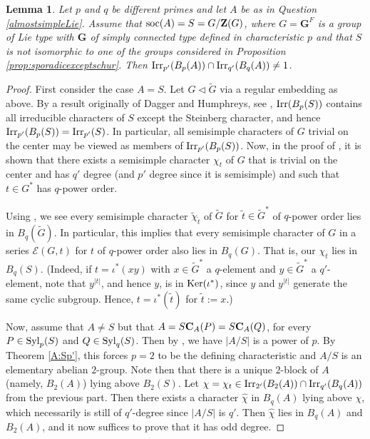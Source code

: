 \documentclass[12pt,leqno,a4paper]{amsart}
\def\zent#1{{\bf Z}(#1)}
\def\irr#1{{\rm Irr}(#1)}
\def\cent#1#2{{\bf C}_{#1}(#2)}
\def\ker#1{{\rm Ker}(#1)}
\def\irrp#1#2{{\rm Irr}_{#1'}(#2)}
\newtheorem{lem}[thm]{Lemma}
\theoremstyle{remark}
\newcommand\wt[1]{\widetilde{#1}}
\begin{document}
\begin{lem}\label{definingchar}
Let $p$ and $q$ be different primes and let $A$ be as in Question \ref{almostsimpleLie}. Assume that $\mathrm{soc}(A)=S=G/\zent{G}$, where $G=\mathbf{G}^F$ is a group of Lie type with $\mathbf{G}$ of simply connected type defined in characteristic $p$ and that $S$ is not isomorphic to one of the groups considered in Proposition \ref{prop:sporadicexceptschur}.  Then $\irrp{p}{B_p(A)} \cap  \irrp{q}{B_q(A)}\neq1$.
\end{lem}
\begin{proof}
First consider the case $A=S$. Let $G\lhd \wt{G}$ via a regular embedding as above.
By a result originally of Dagger and Humphreys, see \cite[Proposition 1.18 and Theorem 3.3]{Cab18}, $\irr{B_p(S)}$ contains all irreducible characters of $S$ except the Steinberg character, and hence $\irrp{p}{B_p(S)}=\irrp{p}{S}$.  In particular, all semisimple characters of $G$ trivial on the center may be viewed as members of $\irrp{p}{B_p(S)}$.  
  Now, in the proof of \cite[Theorem 3.5]{GSV19}, it is shown that there exists a semisimple character $\chi_t$ of $G$ that is trivial on the center and has $q'$ degree (and $p'$ degree since it is semisimple) 
  and such that $t\in G^\ast$ has $q$-power order.
  
   
   Using \cite[Corollary 3.3]{Hiss90}, 
   we see every semisimple character $\wt{\chi}_{\wt{t}}$ of $\wt{G}$ for $\wt{t}\in \wt{G}^\ast$ of $q$-power order lies in $B_q(\wt{G})$.  
   In particular, this implies that every semisimple character of $G$ in a series $\mathcal{E}(G, t)$ for $t$ of $q$-power order also lies in $B_q(G)$. That is, our $\chi_t$ lies in $B_q(S)$. (Indeed, if $t=\iota^\ast(xy)$ with $x\in \wt{G}^\ast$ a $q$-element and $y\in \wt{G}^\ast$ a $q'$-element, note that $y^{|t|}$, and hence $y$, is in $\ker{\iota^\ast}$, since $y$ and $y^{|t|}$ generate the same cyclic subgroup.  Hence, $t=\iota^\ast(\wt{t})$ for $\wt{t}:=x$.) 
  

  
  Now, assume that $A\neq S$ but that $A=S\cent A P=S\cent A Q$, for every $P\in{\rm Syl}_p(S)$ and $Q\in{\rm Syl}_q(S)$.  
  Then by \cite[Lemma 2.2]{BZ}, we have $|A/S|$ is a power of $p$.  By Theorem \ref{A:Sp'}, this forces $p=2$ to be the defining characteristic and   $A/S$ is an elementary abelian $2$-group.  Note then that  there is a unique $2$-block of $A$ (namely, $B_2(A)$) lying above $B_2(S)$. 
   Let $\chi=\chi_t\in \irrp{2}{B_2(A)} \cap  \irrp{q}{B_q(A)}$ from the previous part.  Then there exists a character $\hat \chi$ in $B_q(A)$ lying above $\chi$, which necessarily is still of $q'$-degree since $|A/S|$ is $q'$. 
   Then $\hat\chi$ lies in $B_q(A)$ and $B_2(A)$, and it now suffices to prove that it has odd degree. 
   

\end{proof}
\end{document}
